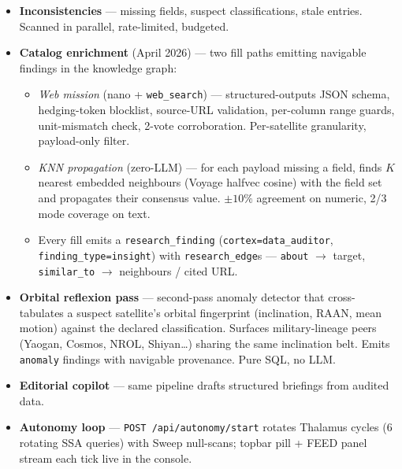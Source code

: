 \begin{itemize}[leftmargin=1.2em]
  \item \textbf{Inconsistencies} --- missing fields, suspect classifications, stale entries. Scanned in parallel, rate-limited, budgeted.
  \item \textbf{Catalog enrichment} (April 2026) --- two fill paths emitting navigable findings in the knowledge graph:
  \begin{itemize}[leftmargin=1.2em]
    \item \emph{Web mission} (nano + \texttt{web\_search}) --- structured-outputs JSON schema, hedging-token blocklist, source-URL validation, per-column range guards, unit-mismatch check, 2-vote corroboration. Per-satellite granularity, payload-only filter.
    \item \emph{KNN propagation} (zero-LLM) --- for each payload missing a field, finds $K$ nearest embedded neighbours (Voyage halfvec cosine) with the field set and propagates their consensus value. $\pm 10\%$ agreement on numeric, 2/3 mode coverage on text.
    \item Every fill emits a \texttt{research\_finding} (\texttt{cortex=data\_auditor}, \texttt{finding\_type=insight}) with \texttt{research\_edge}s --- \texttt{about} $\to$ target, \texttt{similar\_to} $\to$ neighbours / cited URL.
  \end{itemize}
  \item \textbf{Orbital reflexion pass} --- second-pass anomaly detector that cross-tabulates a suspect satellite's orbital fingerprint (inclination, RAAN, mean motion) against the declared classification. Surfaces military-lineage peers (Yaogan, Cosmos, NROL, Shiyan\dots) sharing the same inclination belt. Emits \texttt{anomaly} findings with navigable provenance. Pure SQL, no LLM.
  \item \textbf{Editorial copilot} --- same pipeline drafts structured briefings from audited data.
  \item \textbf{Autonomy loop} --- \texttt{POST /api/autonomy/start} rotates Thalamus cycles (6 rotating SSA queries) with Sweep null-scans; topbar pill + FEED panel stream each tick live in the console.
\end{itemize}


